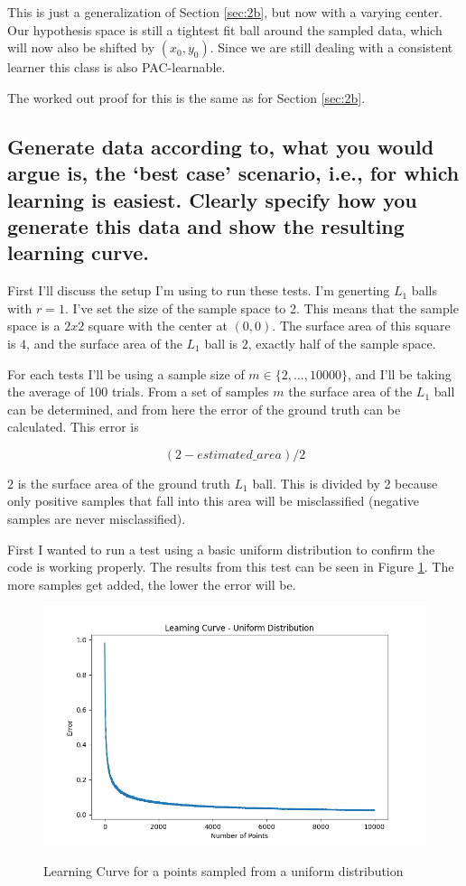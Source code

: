 \documentclass[11pt,a4paper]{article}
\begin{document}
This is just a generalization of Section \ref{sec:2b}, but now with a varying center. Our hypothesis space is still a tightest fit ball around the sampled data, which will now also be shifted by $(x_0, y_0)$. Since we are still dealing with a consistent learner this class is also PAC-learnable.

The worked out proof for this is the same as for Section \ref{sec:2b}.

\subsection{Generate data according to, what you would argue is, the ‘best case’ scenario, i.e., for
which learning is easiest. Clearly specify how you generate this data and show the resulting
learning curve.}

First I'll discuss the setup I'm using to run these tests. I'm generting $L_1$ balls with $r=1$. I've set the size of the sample space to 2. This means that the sample space is a $2x2$ square with the center at $(0,0)$. The surface area of this square is $4$, and the surface area of the $L_1$ ball is $2$, exactly half of the sample space.

For each tests I'll be using a sample size of $m \in \{2, ... , 10000 \}$, and I'll be taking the average of 100 trials. From a set of samples $m$ the surface area of the  $L_1$ ball can be determined, and from here the error of the ground truth can be calculated. This error is 

\[(2 - \textit{estimated\_area}) / 2\]

$2$ is the surface area of the ground truth $L_1$ ball. This is divided by 2 because only positive samples that fall into this area will be misclassified (negative samples are never misclassified).

First I wanted to run a test using a basic uniform distribution to confirm the code is working properly. The results from this test can be seen in Figure \ref{fig:learningcurve_uniform}. The more samples get added, the lower the error will be.

\begin{figure}[h]
    \caption{Learning Curve for a points sampled from a uniform distribution}
    \centering
    \includegraphics[width=\textwidth]{learningcurve_uniform.png}
    \label{fig:learningcurve_uniform}
\end{figure}
\end{document}
